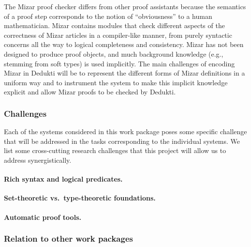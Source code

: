 The Mizar proof checker differs from other proof assistants because the
semantics of a proof step corresponds to the notion of ``obviousness'' to a
human mathematician. Mizar contains modules that check different aspects of the
correctness of Mizar articles in a compiler-like manner, from purely syntactic
concerns all the way to logical completeness and consistency. Mizar has not been
designed to produce proof objects, and much background knowledge (e.g., stemming
from soft types) is used implicitly. The main challenges of encoding Mizar in
Dedukti will be to represent the different forms of Mizar definitions in a
uniform way and to instrument the system to make this implicit knowledge
explicit and allow Mizar proofs to be checked by Dedukti.


\subsubsection*{Challenges}

Each of the systems considered in this work package poses some specific
challenge that will be addressed in the tasks corresponding to the individual
systems. We list some cross-cutting research challenges that this project will
allow us to address synergistically.

\paragraph*{Rich syntax and logical predicates.}



\paragraph*{Set-theoretic vs.\ type-theoretic foundations.}


\paragraph*{Automatic proof tools.}


\subsubsection*{Relation to other work packages}

